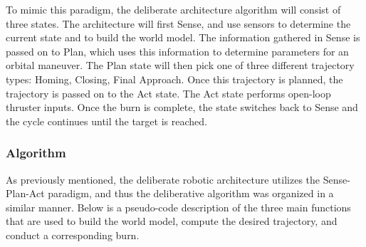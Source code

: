 \documentclass[journal, 10pt]{IEEEtran}
\begin{document}
To mimic this paradigm, the deliberate architecture algorithm will consist of three states. The architecture will first Sense, and use sensors to determine the current state and to build the world model. The information gathered in Sense is passed on to Plan, which uses this information to determine parameters for an orbital maneuver. The Plan state will then pick one of three different trajectory types: Homing, Closing, Final Approach. Once this trajectory is planned, the trajectory is passed on to the Act state. The Act state performs open-loop thruster inputs. Once the burn is complete, the state switches back to Sense and the cycle continues until the target is reached.

\subsubsection{Algorithm}
As previously mentioned, the deliberate robotic architecture utilizes the Sense-Plan-Act paradigm, and thus the deliberative algorithm was organized in a similar manner. Below is a pseudo-code description of the three main functions that are used to build the world model, compute the desired trajectory, and conduct a corresponding burn. 
\end{document}
